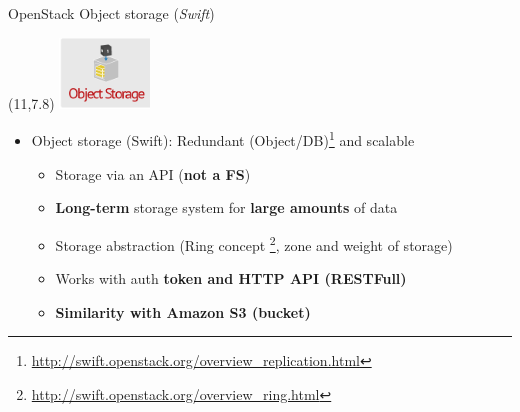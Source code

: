 \begin{frame}{OpenStack Object storage (\textsl{Swift})}
  \begin{textblock}{}(11,7.8)
    \includegraphics[width=6.5em]{img/swift}
  \end{textblock}
  \begin{itemize}
    \item Object storage (Swift): Redundant (Object/DB)\footnote{\url{http://swift.openstack.org/overview\_replication.html}} and scalable
      \medskip
    \begin{itemize}
      \item Storage via an API (\textbf{not a FS})
        \medskip
      \item \textbf{Long-term} storage system for \textbf{large amounts} of data
        \medskip
      \item Storage abstraction (Ring concept \footnote{\url{http://swift.openstack.org/overview\_ring.html}}, zone and weight of storage)
        \medskip
      \item Works with auth \textbf{token and HTTP API (RESTFull)}
        \medskip
      \item \textbf{Similarity with Amazon S3 (bucket)}
    \end{itemize}
  \end{itemize}
\end{frame}

